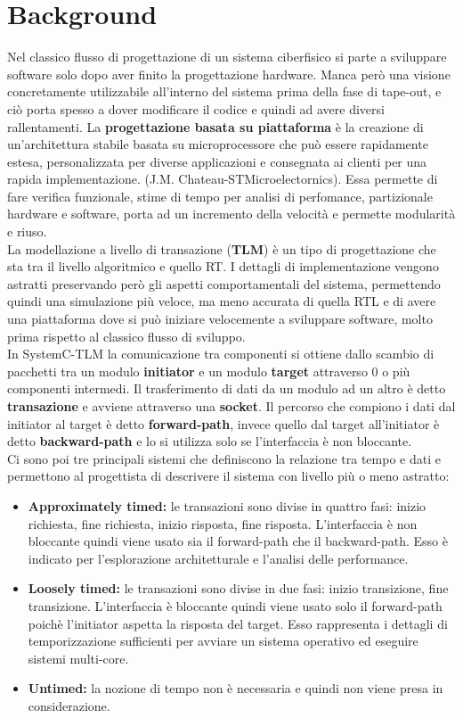 \documentclass[]{IEEEtran}
\begin{document}
\section{Background}
Nel classico flusso di progettazione di un sistema ciberfisico si parte a sviluppare software solo dopo aver finito la progettazione hardware. Manca però una visione concretamente utilizzabile all'interno del sistema prima della fase di tape-out, e ciò porta spesso a dover modificare il codice e quindi ad avere diversi rallentamenti.
La \textbf{progettazione basata su piattaforma} è la creazione di un'architettura stabile basata su microprocessore che può essere rapidamente estesa, personalizzata per diverse applicazioni e consegnata ai clienti per una rapida implementazione. (J.M. Chateau-STMicroelectornics). Essa permette di fare verifica funzionale, stime di tempo per analisi di perfomance, partizionale hardware e software, porta ad un incremento della velocità e permette modularità e riuso.
\\La modellazione a livello di transazione (\textbf{TLM}) è un tipo di progettazione che sta tra il livello algoritmico e quello RT. I dettagli di implementazione vengono astratti preservando però gli aspetti comportamentali del sistema, permettendo quindi una simulazione più veloce, ma meno accurata di quella RTL e di avere una piattaforma dove si può iniziare velocemente a sviluppare software, molto prima rispetto al classico flusso di sviluppo.
\\In SystemC-TLM la comunicazione tra componenti si ottiene dallo scambio di pacchetti tra un modulo \textbf{initiator} e un modulo \textbf{target} attraverso 0 o più componenti intermedi. Il trasferimento di dati da un modulo ad un altro è detto \textbf{transazione} e avviene attraverso una \textbf{socket}. Il percorso che compiono i dati dal initiator al target è detto \textbf{forward-path}, invece quello dal target all'initiator è detto \textbf{backward-path} e lo si utilizza solo se l'interfaccia è non bloccante.
\\Ci sono poi tre principali sistemi che definiscono la relazione tra tempo e dati e permettono al progettista di descrivere il sistema con livello più o meno astratto:
\begin{itemize}
    \item \textbf{Approximately timed: } le transazioni sono divise in quattro fasi: inizio richiesta, fine richiesta, inizio risposta, fine risposta. L'interfaccia è non bloccante quindi viene usato sia il forward-path che il backward-path. Esso è indicato per l'esplorazione architetturale e l'analisi delle performance.
    \item \textbf{Loosely timed: } le transazioni sono divise in due fasi: inizio transizione, fine transizione. L'interfaccia è bloccante quindi viene usato solo il forward-path poichè l'initiator aspetta la risposta del target. Esso rappresenta i dettagli di temporizzazione sufficienti per avviare un sistema operativo ed eseguire sistemi multi-core.
    \item \textbf{Untimed: } la nozione di tempo non è necessaria e quindi non viene presa in considerazione.
\end{itemize}
\end{document}
